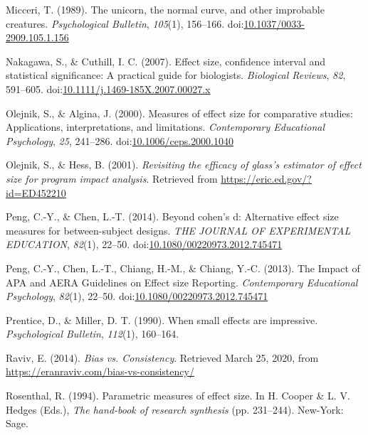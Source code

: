 \documentclass[
  man,floatsintext]{apa6}
\begin{document}
\leavevmode\hypertarget{ref-Micceri_1989}{}%
Micceri, T. (1989). The unicorn, the normal curve, and other improbable creatures. \emph{Psychological Bulletin}, \emph{105}(1), 156--166. doi:\href{https://doi.org/10.1037/0033-2909.105.1.156}{10.1037/0033-2909.105.1.156}

\leavevmode\hypertarget{ref-Nakagawa_and_Cuthill_2007}{}%
Nakagawa, S., \& Cuthill, I. C. (2007). Effect size, confidence interval and statistical significance: A practical guide for biologists. \emph{Biological Reviews}, \emph{82}, 591--605. doi:\href{https://doi.org/10.1111/j.1469-185X.2007.00027.x}{10.1111/j.1469-185X.2007.00027.x}

\leavevmode\hypertarget{ref-Olejnik_Algina_2000}{}%
Olejnik, S., \& Algina, J. (2000). Measures of effect size for comparative studies: Applications, interpretations, and limitations. \emph{Contemporary Educational Psychology}, \emph{25}, 241--286. doi:\href{https://doi.org/10.1006/ceps.2000.1040}{10.1006/ceps.2000.1040}

\leavevmode\hypertarget{ref-Olejnik_Hess_2001}{}%
Olejnik, S., \& Hess, B. (2001). \emph{Revisiting the efficacy of glass's estimator of effect size for program impact analysis}. Retrieved from \url{https://eric.ed.gov/?id=ED452210}

\leavevmode\hypertarget{ref-Peng_and_Chen_2014}{}%
Peng, C.-Y., \& Chen, L.-T. (2014). Beyond cohen's d: Alternative effect size measures for between-subject designs. \emph{THE JOURNAL OF EXPERIMENTAL EDUCATION}, \emph{82}(1), 22--50. doi:\href{https://doi.org/10.1080/00220973.2012.745471}{10.1080/00220973.2012.745471}

\leavevmode\hypertarget{ref-Peng_et_al_2013}{}%
Peng, C.-Y., Chen, L.-T., Chiang, H.-M., \& Chiang, Y.-C. (2013). The Impact of APA and AERA Guidelines on Effect size Reporting. \emph{Contemporary Educational Psychology}, \emph{82}(1), 22--50. doi:\href{https://doi.org/10.1080/00220973.2012.745471}{10.1080/00220973.2012.745471}

\leavevmode\hypertarget{ref-Prentice_Miller_1992}{}%
Prentice, D., \& Miller, D. T. (1990). When small effects are impressive. \emph{Psychological Bulletin}, \emph{112}(1), 160--164.

\leavevmode\hypertarget{ref-Raviv}{}%
Raviv, E. (2014). \emph{Bias vs. Consistency}. Retrieved March 25, 2020, from \url{https://eranraviv.com/bias-vs-consistency/}

\leavevmode\hypertarget{ref-Rosenthal_1994}{}%
Rosenthal, R. (1994). Parametric measures of effect size. In H. Cooper \& L. V. Hedges (Eds.), \emph{The hand-book of research synthesis} (pp. 231--244). New-York: Sage.
\end{document}
